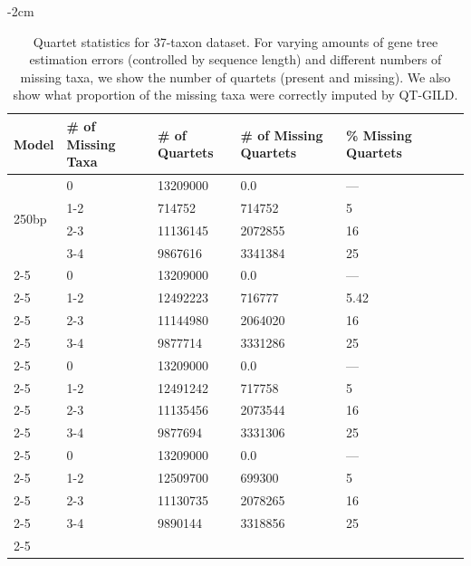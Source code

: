 \begin{table}[H]
  \small
  \centering
    \addtolength{\leftskip} {-2cm} %
    \addtolength{\rightskip}{-2cm}
    \caption{Quartet statistics for 37-taxon dataset. For varying amounts of gene tree estimation errors (controlled by sequence length) and different numbers of missing taxa, we show the number of quartets (present and missing). We also show what proportion of the missing taxa were correctly imputed by QT-GILD.}
    \label{tab:qstat-37-seq}
\begin{tabularx}{1.2\textwidth}{|X|X|X|X|X|X|X|}


\hline
Model & \# of Missing Taxa & \# of Quartets  &  \# of Missing Quartets & \% Missing Quartets \\
    \hline \hline
    \multirow{4}{0.25\textwidth}{250bp} 
    & 0   & 13209000 &    0.0       &   --- \\  \cline{2-5}
    & 1-2 & 714752   &	  714752    &	5\\ \cline{2-5}
    & 2-3 & 11136145 &    2072855	&	16 \\ \cline{2-5}
    & 3-4 & 9867616  &	  3341384   &	25 \\ \cline{2-5}
    \hline
    
    \multirow{4}{0.25\textwidth}{500bp} 
    & 0   & 13209000 &    0.0     & --- \\  \cline{2-5}
    & 1-2 & 12492223 &	716777    & 5.42\\ \cline{2-5}
    & 2-3 & 11144980 &	2064020   & 16 \\ \cline{2-5}
    & 3-4 & 9877714  &	3331286   & 25 \\ \cline{2-5}
    \hline
    
    \multirow{4}{0.25\textwidth}{1000bp} 
    & 0   & 13209000 &    0.0     & --- \\  \cline{2-5}
    & 1-2 & 12491242 &	717758   & 5 \\ \cline{2-5}
    & 2-3 & 11135456 &	2073544   & 16 \\ \cline{2-5}
    & 3-4 & 9877694  &	3331306  & 25 \\ \cline{2-5}
    \hline
    
    \multirow{4}{0.25\textwidth}{true} 
    & 0   & 13209000 &    0.0     & --- \\  \cline{2-5}
    & 1-2 & 12509700 &	699300   & 5 \\ \cline{2-5}
    & 2-3 & 11130735 &	2078265   & 16 \\ \cline{2-5}
    & 3-4 & 9890144  &	3318856  & 25 \\ \cline{2-5}
    \hline
    
    
    


\hline
    
\end{tabularx}

\end{table}